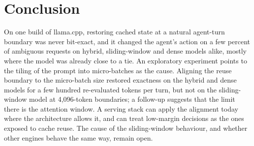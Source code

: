 \section{Conclusion}
\label{sec:conclusion}

On one build of llama.cpp, restoring cached state at a natural agent-turn
boundary was never bit-exact, and it changed the agent's action on a few
percent of ambiguous requests on hybrid, sliding-window and dense models alike,
mostly where the model was already close to a tie. An exploratory experiment
points to the tiling of the prompt into micro-batches as the cause. Aligning
the reuse boundary to the micro-batch size restored exactness on the hybrid and
dense models for a few hundred re-evaluated tokens per turn, but not on the
sliding-window model at 4{,}096-token boundaries; a follow-up suggests that the
limit there is the attention window. A serving stack can apply the alignment
today where the architecture allows it, and can treat low-margin decisions as
the ones exposed to cache reuse. The cause of the sliding-window behaviour, and
whether other engines behave the same way, remain open.
